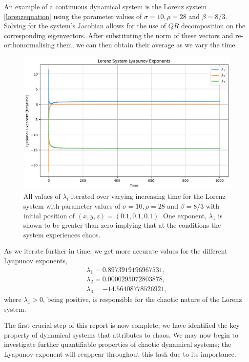\begin{exmp} An example of a continuous dynamical system is the Lorenz system \ref{lorenzequation} using the parameter values of $ \sigma = 10, \rho = 28 $ and $ \beta = 8/3$. Solving for the system's Jacobian allows for the use of $QR$ decomposition on the corresponding eigenvectors. After substituting the norm of these vectors and re-orthonormalising them, we can then obtain their average as we vary the time. \cite{OED}
\begin{figure}
    \centering
    \includegraphics[width=1\linewidth]{Images/lorenz_lypunov.png}
    \caption{All values of $\lambda_i$ iterated over varying increasing time for the Lorenz system with parameter values of $\sigma = 10, \rho = 28$ and $\beta = 8/3$ with initial position of $(x,y,z)=(0.1,0.1,0.1)$. One exponent, $\lambda_1$ is shown to be greater than zero implying that at the conditions the system experiences chaos.}
    \label{fig:enter-label}
\end{figure}
As we iterate further in time, we get more accurate values for the different Lyapunov exponents, %
\begin{align*}
    \lambda_1 = 0.8973919196967531, \\
    \lambda_2 = 0.0000295072803878 ,\\
    \lambda_3 = -14.56408778526921,
\end{align*}
where $\lambda_1>0$, being positive, is responsible for the chaotic nature of the Lorenz system.
\end{exmp}
The first crucial step of this report is now complete; we have identified the key property of dynamical systems that attributes to chaos. We may now begin to investigate further quantifiable properties of chaotic dynamical systems; the Lyapunov exponent will reappear throughout this task due to its importance.
